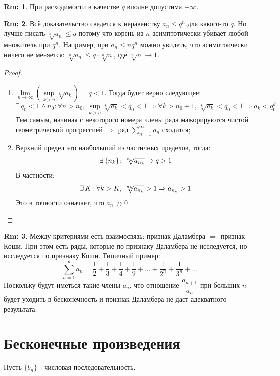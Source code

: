 \documentclass[12pt]{article}
\theoremstyle{definition}
\newtheorem{rem}{Rm:}
\newcommand{\ssum}[1]{\displaystyle \sum\limits_{n=1}^{\infty}{#1}_n}
\begin{document}
\begin{rem}
	При расходимости в качестве $q$ вполне допустима $+\infty$.
\end{rem}
\begin{rem}
	Всё доказательство сведется к неравенству $a_n \leq q^n$ для какого-то $q$. Но лучше писать $\sqrt[n]{a_n} \leq q$ потому что корень из $n$ асимптотически убивает любой множитель при $q^n$. Например, при $a_n \leq n q^n$ можно увидеть, что асимптоически ничего не меняется: $\sqrt[n]{a_n} \leq q {\cdot} \sqrt[n]{n}$, где $\sqrt[n]{n} \to 1$.
\end{rem}
\begin{proof}\hfill
		\begin{enumerate}[label ={(\arabic*)}]
		\item $\lim\limits_{n \to \infty} \left(\sup\limits_{k > n} \sqrt[k]{a_k}\right) = q < 1$. Тогда будет верно следующее:
		$$
			\exists \, q_0 < 1 \wedge n_0 \colon \forall n > n_0, \, \sup\limits_{k > n} \sqrt[k]{a_k} < q_0 < 1 \Rightarrow \forall k > n_0 + 1, \, \sqrt[k]{a_k} < q_0 < 1 \Rightarrow a_k < q_0^k
		$$
		Тем самым, начиная с некоторого номера члены ряда мажорируются чистой геометрической прогрессией $\Rightarrow$ ряд $\ssum{a}$ сходится; 
		
		\item Верхний предел это наибольший из частичных пределов, тогда: 
		$$
			\exists \, \{n_k\} \colon \sqrt[\leftroot{-2}\uproot{3}n_k]{a_{n_k}} \to q > 1
		$$ 
		В частности: 
		$$
			\exists \, K \colon \forall k > K, \, \sqrt[\leftroot{-2}\uproot{3}n_k]{a_{n_k}} > 1 \Rightarrow a_{n_k} > 1
		$$
		Это в точности означает, что $a_n \nrightarrow 0$
	\end{enumerate}
\end{proof}
\begin{rem}
	Между критериями есть взаимосвязь: признак Даламбера $\Rightarrow$ признак Коши. При этом есть ряды, которые по признаку Даламбера не исследуется, но исследуется по признаку Коши. Типичный пример:
	$$
		\ssum{a} = \dfrac{1}{2} + \dfrac{1}{3} + \dfrac{1}{4} + \dfrac{1}{9} + \dotsc + \dfrac{1}{2^n} + \dfrac{1}{3^n} + \dotsc
	$$
	Поскольку будут иметься такие члены $a_n$, что отношение $\dfrac{a_{n+1}}{a_n}$ при больших $n$ будет уходить в бесконечность и признак Даламбера не даст адекватного результата.
\end{rem}
\newpage
\section*{Бесконечные произведения}
Пусть $\{b_n\}$ - числовая последовательность.
\end{document}
